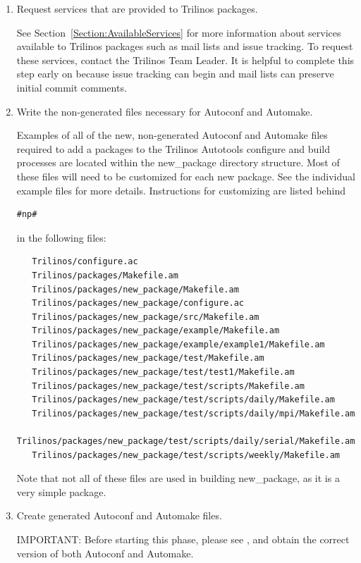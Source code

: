 \documentclass[12pt,relax]{TrilinosDevGuide}
\begin{document}
\begin{enumerate}

\item Request services that are provided to Trilinos packages.

See Section~\ref{Section:AvailableServices} for more information about 
services available to Trilinos packages such as mail lists and issue 
tracking.  To request these services, contact the Trilinos Team Leader.  
It is helpful to complete this step early on because issue tracking can 
begin and mail lists can preserve initial commit comments.

\item Write the non-generated files necessary for Autoconf and Automake.

Examples of all of the new, non-generated Autoconf and Automake files
required to add a packages to the Trilinos Autotools configure and build 
processes are located within the new\_package directory structure.  Most of 
these files will need to be customized for each new package.  See the 
individual example files for more details.  Instructions for customizing are 
listed behind 
\begin{verbatim}
#np# 
\end{verbatim}
in the following files:
\begin{verbatim}
   Trilinos/configure.ac
   Trilinos/packages/Makefile.am
   Trilinos/packages/new_package/Makefile.am
   Trilinos/packages/new_package/configure.ac  
   Trilinos/packages/new_package/src/Makefile.am
   Trilinos/packages/new_package/example/Makefile.am
   Trilinos/packages/new_package/example/example1/Makefile.am
   Trilinos/packages/new_package/test/Makefile.am
   Trilinos/packages/new_package/test/test1/Makefile.am
   Trilinos/packages/new_package/test/scripts/Makefile.am
   Trilinos/packages/new_package/test/scripts/daily/Makefile.am
   Trilinos/packages/new_package/test/scripts/daily/mpi/Makefile.am
   Trilinos/packages/new_package/test/scripts/daily/serial/Makefile.am
   Trilinos/packages/new_package/test/scripts/weekly/Makefile.am
\end{verbatim}

Note that not all of these files are used in building new\_package, as it is 
a very simple package.

\item Create generated Autoconf and Automake files.

IMPORTANT: Before starting this phase, please see \newline
{}, and obtain the correct 
version of both Autoconf and Automake.


\end{enumerate}
\end{document}
